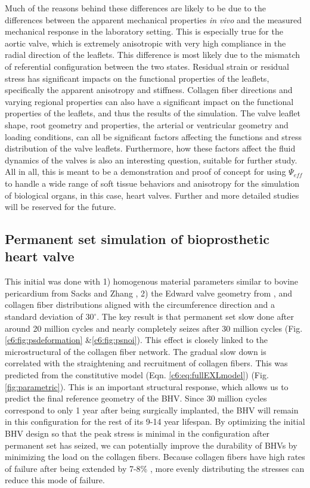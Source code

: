     Much of the reasons behind these differences are likely to be due to the differences between the apparent mechanical properties \textit{in vivo} and the measured mechanical response in the laboratory setting. This is especially true for the aortic valve, which is extremely anisotropic with very high compliance in the radial direction of the leaflets. This difference is most likely due to the mismatch of referential configuration between the two states. Residual strain or residual stress has significant impacts on the functional properties of the leaflets, specifically the apparent anisotropy and stiffness. Collagen fiber directions and varying regional properties can also have a significant impact on the functional properties of the leaflets, and thus the results of the simulation. The valve leaflet shape, root geometry and properties, the arterial or ventricular geometry and loading conditions, can all be significant factors affecting the functions and stress distribution of the valve leaflets. Furthermore, how these factors affect the fluid dynamics of the valves is also an interesting question, suitable for further study. All in all, this is meant to be a demonstration and proof of concept for using $\Psi_{eff}$ to handle a wide range of soft tissue behaviors and anisotropy for the simulation of biological organs, in this case, heart valves. Further and more detailed studies will be reserved for the future.  



\subsection{Permanent set simulation of bioprosthetic heart valve}
    This initial was done with 1) homogenous material parameters similar to bovine pericardium from Sacks and Zhang \cite{sacks_novel_2015}, 2) the Edward valve geometry from \cite{aggarwal_inverse_2015}, and collagen fiber distributions aligned with the circumference direction and a standard deviation of $30^\circ$. The key result is that permanent set slow done after around 20 million cycles and nearly completely seizes after 30 million cycles (Fig. \ref{c6:fig:psdeformation} \&\ref{c6:fig:psnoi}). This effect is closely linked to the microstructural of the collagen fiber network. The gradual slow down is correlated with the straightening and recruitment of collagen fibers. This was predicted from the constitutive model (Eqn. \ref{c6:eq:fullEXLmodel}) (Fig. \ref{fig:parametric}). This is an important structural response, which allows us to predict the final reference geometry of the BHV. Since 30 million cycles correspond to only 1 year after being surgically implanted, the BHV will remain in this configuration for the rest of its 9-14 year lifespan. By optimizing the initial BHV design so that the peak stress is minimal in the configuration after permanent set has seized, we can potentially improve the durability of BHVs by minimizing the load on the collagen fibers. Because collagen fibers have high rates of failure after being extended by 7-8\% \cite{lanir_structural_1979}\cite{buehler_atomistic_2006}, more evenly distributing the stresses can reduce this mode of failure. 
    
